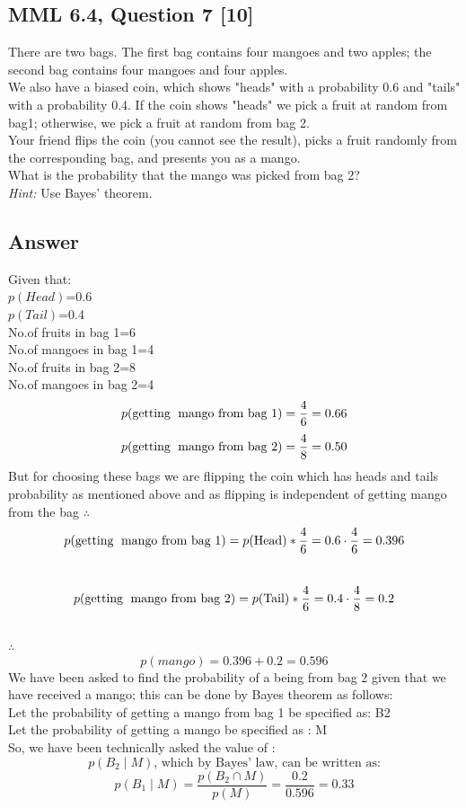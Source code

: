 \documentclass[12pt]{article}
\begin{document}
\subsection*{MML 6.4, Question 7 [10]}
There are two bags. The first bag contains four mangoes and two apples; the second bag contains four mangoes and four apples.\\
We also have a biased coin, which shows "heads" with a probability 0.6 and "tails" with a probability 0.4. If the coin shows "heads" we pick a fruit at random from bag1; otherwise, we pick a fruit at random from bag 2.\\
Your friend flips the coin (you cannot see the result), picks a fruit randomly from the corresponding bag, and presents you as a mango.\\
What is the probability that the mango was picked from bag 2?\\
\textit{Hint:} Use Bayes' theorem.
\subsection*{Answer}
Given that:\\
\(  p(Head) \)=0.6\\
\(  p(Tail) \)=0.4\\
No.of fruits in bag 1=6\\
No.of mangoes in bag 1=4\\
No.of fruits in bag 2=8\\
No.of mangoes in bag 2=4\\
\[
p(\text{getting\; mango from bag 1}) = \frac{4}{6} = 0.66
\]
\[
p(\text{getting\; mango from bag 2}) = \frac{4}{8} = 0.50
\]
But for choosing these bags we are flipping the coin which has heads and tails probability as mentioned above and as flipping is independent of getting mango from the bag \(\therefore\) \[
p(\text{getting\; mango from bag 1}) = p(\text{Head})*\frac{4}{6} = 0.6 \cdot \frac{4}{6} = 0.396
\]\\
\[
p(\text{getting\; mango from bag 2}) = p(\text{Tail})*\frac{4}{6} = 0.4 \cdot \frac{4}{8} = 0.2
\] \\
\(\therefore\) \ \[p(mango)=0.396+0.2=0.596\]
We have been asked to find the probability of a being from bag 2 given that we have received a mango; this can be done by Bayes theorem as follows:\\

Let the probability of getting a mango from bag 1 be specified as: B2\\
Let the probability of getting a mango be specified as : M\\
So, we have been technically asked the value of :\\  
\[
p(B_2 \mid M) \text{, which by Bayes' law, can be written as:}
\]
\[
p(B_1 \mid M) = \frac{p(B_2 \cap M)}{p(M)} =\frac{0.2}{0.596}=0.33
\]
\end{document}
